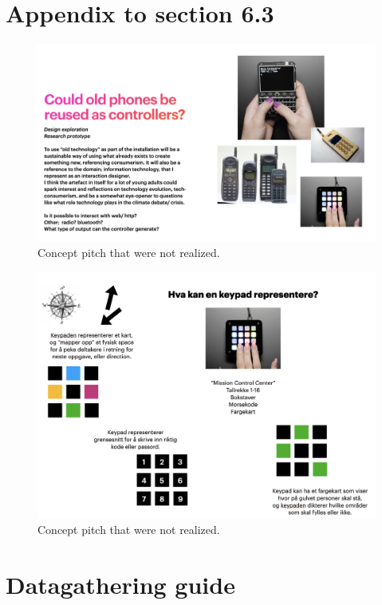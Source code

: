 \section{Appendix to section 6.3}

\begin{figure}[H]
     \centering 
    \includegraphics[width=12.5cm]{pictures/appendix/oldphone_pitch.png}
    \caption{Concept pitch that were not realized.}
\end{figure}

\begin{figure}[H]
    \centering 
    \includegraphics[width=12.5cm]{pictures/appendix/keypad_pitch.png}
    \caption{Concept pitch that were not realized.}
\end{figure}


\section{Datagathering guide}

